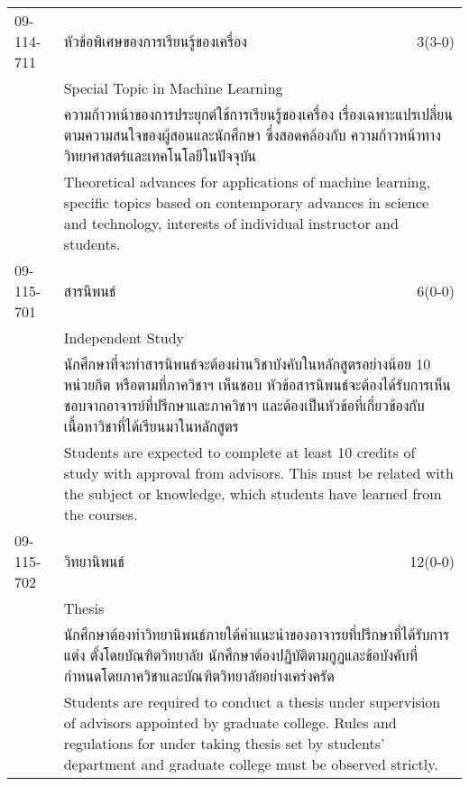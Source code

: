 \begin{longtable}{p{}p{}r{}}
09-114-711 & หัวข้อพิเศษของการเรียนรู้ของเครื่อง  & 3(3-0)\\*
 & Special Topic in Machine Learning & \phantom{x} \vspace{3mm} \\*
&  \multicolumn{2}{p{0.75\textwidth}}{ความก้าวหน้าของการประยุกต์ใช้การเรียนรู้ของเครื่อง เรื่องเฉพาะแปรเปลี่ยนตามความสนใจของผู้สอนและนักศึกษา ซึ่งสอดคล้องกับ ความก้าวหน้าทางวิทยาศาสตร์และเทคโนโลยีในปัจจุบัน } \vspace{3mm} \\*
&  \multicolumn{2}{p{0.75\textwidth}}{Theoretical advances for applications of machine learning, specific topics based on contemporary advances in science and technology, interests of individual instructor and students.} \vspace{8mm} \\*
09-115-701 & สารนิพนธ์ & 6(0-0)\\*
 & Independent Study & \phantom{x} \vspace{3mm} \\*
&  \multicolumn{2}{p{0.75\textwidth}}{นักศึกษาที่จะทำสารนิพนธ์จะต้องผ่านวิชาบังคับในหลักสูตรอย่างน้อย 10 หน่วยกิต หรือตามที่ภาควิชาฯ เห็นชอบ หัวข้อสารนิพนธ์จะต้องได้รับการเห็นชอบจากอาจารย์ที่ปรึกษาและภาควิชาฯ และต้องเป็นหัวข้อที่เกี่ยวข้องกับเนื้อหาวิชาที่ได้เรียนมาในหลักสูตร } \vspace{3mm} \\*
&  \multicolumn{2}{p{0.75\textwidth}}{Students are expected to complete at least 10 credits of study with approval from advisors. This must be related with the subject or knowledge, which students have learned from the courses.} \vspace{8mm} \\*
09-115-702 & วิทยานิพนธ์ & 12(0-0)\\*
 & Thesis & \phantom{x} \vspace{3mm} \\*
&  \multicolumn{2}{p{0.75\textwidth}}{นักศึกษาต้องทำวิทยานิพนธ์ภายใต้คำแนะนำของอาจารยที่ปรึกษาที่ได้รับการแต่ง ตั้งโดยบัณฑิตวิทยาลัย นักศึกษาต้องปฏิบัติตามกูฏและข้อบังคับที่กำหนดโดยภาควิชาและบัณฑิตวิทยาลัยอย่างเคร่งครัด} \vspace{3mm} \\*
&  \multicolumn{2}{p{0.75\textwidth}}{Students are required to conduct a thesis under supervision of advisors appointed by graduate college. Rules and regulations for under taking thesis set by students’ department and graduate college must be observed strictly.} \vspace{8mm} \\*

\end{longtable}
